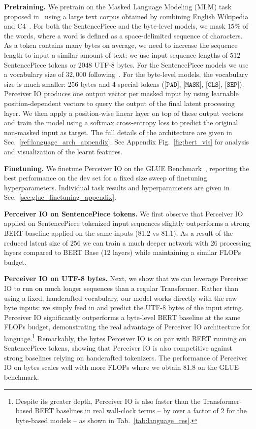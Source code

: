 \documentclass{article} %
\newcommand{\ourmodel}{Perceiver IO\xspace}
\begin{document}
\noindent
\textbf{Pretraining.}
We pretrain on the Masked Language Modeling (MLM) task proposed in~\cite{devlin2019bert} using a large text corpus obtained by combining English Wikipedia and C4~\citep{raffell2020exploring}. For both the SentencePiece and the byte-level models, we mask $15\%$ of the words, where a word is defined as a space-delimited sequence of characters. 
As a token contains many bytes on average, we need to increase the sequence length to input a similar amount of text: we use input sequence lengths of $512$ SentencePiece tokens or $2048$ UTF-8 bytes. 
For the SentencePiece models we use a vocabulary size of $32,000$ following~\cite{devlin2019bert}. 
For the byte-level models, the vocabulary size is much smaller: 256 bytes and 4 special tokens ($\texttt{[PAD]}$, $\texttt{[MASK]}$, $\texttt{[CLS]}$, $\texttt{[SEP]}$).
\ourmodel{} produces one output vector per masked input by using learnable position-dependent vectors to query the output of the final latent processing layer.
We then apply a position-wise linear layer on top of these output vectors and train the model using a softmax cross-entropy loss to predict the original non-masked input as target.
The full details of the architecture are given in Sec.~\ref{ref:language_arch_appendix}. See Appendix Fig.~\ref{fig:bert_vis} for analysis and visualization of the learnt features.


\noindent
\textbf{Finetuning.}
We finetune \ourmodel{} on the GLUE Benchmark~\cite{wang2018glue}, reporting the best performance on the dev set for a fixed size sweep of finetuning hyperparameters. Individual task results and hyperparameters are given in Sec.~\ref{sec:glue_finetuning_appendix}. 

\noindent
\textbf{\ourmodel{} on SentencePiece tokens.}
We first observe that \ourmodel{} applied on SentencePiece tokenized input sequences slightly outperforms a strong BERT baseline applied on the same inputs (81.2 vs 81.1).
As a result of the reduced latent size of $256$ we can train a much deeper network with 26 processing layers compared to BERT Base (12 layers) while maintaining a similar FLOPs budget.

\noindent
\textbf{\ourmodel{} on UTF-8 bytes.}
Next, we show that we can leverage \ourmodel{} to run on much longer sequences than a regular Transformer. Rather than using a fixed, handcrafted vocabulary, our model works directly with the raw byte inputs: we simply feed in and predict the UTF-8 bytes of the input string.
\ourmodel{} significantly outperforms a byte-level BERT baseline at the same FLOPs budget, demonstrating the real advantage of \ourmodel{} architecture for language.\footnote{Despite its greater depth, \ourmodel is also faster than the Transformer-based BERT baselines in real wall-clock terms -- by over a factor of 2 for the byte-based models -- as shown in Tab.~\ref{tab:language_res}.}
Remarkably, the bytes \ourmodel{} is on par with BERT running on SentencePiece tokens, showing that \ourmodel{} is also competitive against strong baselines relying on handcrafted tokenizers. The performance of \ourmodel{} on bytes scales well with more FLOPs where we obtain 81.8 on the GLUE benchmark.
\end{document}
